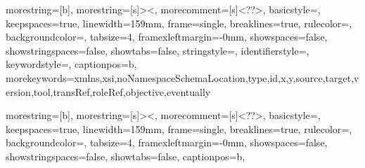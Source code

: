 
{
  morestring=[b],
  morestring=[s]{>}{<},
  morecomment=[s]{<?}{?>},
  basicstyle=\ttfamily\small,
  keepspaces=true,                 
  linewidth=159mm,
  frame=single,  
  breaklines=true,
  rulecolor=\color{black!40},
  backgroundcolor=\color{gray!10},
  tabsize=4,
  framexleftmargin=-0mm,      
  showspaces=false,                
  showstringspaces=false,
  showtabs=false,     
  stringstyle=\color{black},
  identifierstyle=\color{darkblue},
  keywordstyle=\color{cyan},
  captionpos=b,
  morekeywords={xmlns,xsi,noNamespaceSchemaLocation,type,id,x,y,source,target,version,tool,transRef,roleRef,objective,eventually}
}

{
  morestring=[b],
  morestring=[s]{>}{<},
  morecomment=[s]{<?}{?>},
  basicstyle=\ttfamily\small,
  keepspaces=true,                 
  linewidth=159mm,
  frame=single,  
  breaklines=true,
  rulecolor=\color{white},
  backgroundcolor=\color{gray!10},
  tabsize=4,
  framexleftmargin=-0mm,      
  showspaces=false,                
  showstringspaces=false,
  showtabs=false,     
  captionpos=b,
}

\renewcommand{\lstlistingname}{Sourcecode}
